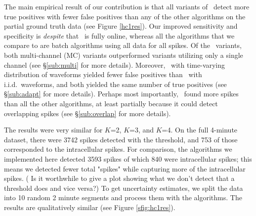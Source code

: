   The main empirical result of our contribution is that all variants of \smug~detect more true positives with fewer false positives
than any of the other algorithms on the partial ground truth data (see Figure \ref{hc1res}).  
Our improved sensitivity and specificity is \emph{despite} that \smug~is fully online, whereas all the algorithms that we compare to are batch algorithms using all data for all spikes.  Of the \smug~variants, both multi-channel (MC) variants outperformed variants utilizing only a single channel (see \S \ref{sub:multi} for more details).  Moreover, \smug~with time-varying distribution of waveforms yielded fewer false positives than \smug~with i.i.d.~waveforms, and both yielded the same number of true positives (see \S \ref{sub:adapt} for more details).  Perhaps most importantly, \smug~found more spikes than all the other algorithms, at least partially because it could detect overlapping spikes (see \S \ref{sub:overlap} for more details).


The results were very similar for $K$=2, $K$=3, and $K$=4.   On the full 4-minute dataset, there were 3742 spikes detected with the threshold, and 753 of those corresponded to the intracellular spikes.  
For comparison, the algorithms we implemented here detected 3593 spikes of which 840 were intracellular spikes; this means we detected fewer total "spikes" while capturing more of the intracellular spikes. ({\color{red}  Is it worthwhile to give a plot showing what we don't detect that a threshold does and vice versa?})
To get uncertainty estimates, we split the data into 10 random 2 minute segments and process them with the algorithms. The results are qualitatively similar (see Figure \ref{sfig:hc1res}).



